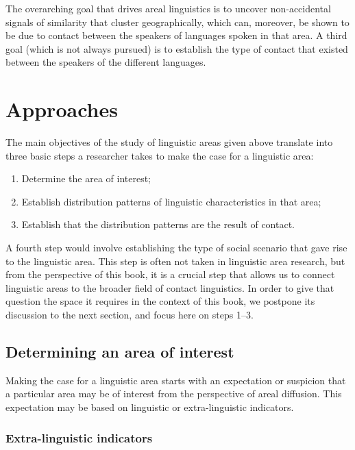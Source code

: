 \documentclass[output=paper]{langscibook}
\begin{document}
The overarching goal that drives areal linguistics is to uncover non-accidental signals of similarity that cluster geographically, which can, moreover, be shown to be due to contact between the speakers of languages spoken in that area. A third goal (which is not always pursued) is to establish the type of contact that existed between the speakers of the different languages.

\section{Approaches} \label{sec-approaches}

The main objectives of the study of linguistic areas given above translate into three basic steps a researcher takes to make the case for a linguistic area: 

\begin{enumerate}
\setlength{\itemsep}{0.0\baselineskip}
\item Determine the area of interest;
\item Establish distribution patterns of linguistic characteristics in that area;
\item Establish that the distribution patterns are the result of contact.
\end{enumerate}

A fourth step would involve establishing the type of social scenario that gave rise to the linguistic area. This step is often not taken in linguistic area research, but from the perspective of this book, it is a crucial step that allows us to connect linguistic areas to the broader field of contact linguistics. In order to give that question the space it requires in the context of this book, we postpone its discussion to the next section, and focus here on steps 1--3. 

\subsection{Determining an area of interest}

Making the case for a linguistic area starts with an expectation or suspicion that a particular area may be of interest from the perspective of areal diffusion. This expectation may be based on linguistic or extra-linguistic indicators.

\subsubsection{Extra-linguistic indicators}
\label{subsec:Extra-linguistic indicators}
\end{document}
